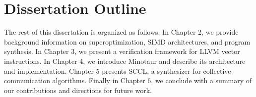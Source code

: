 \section{Dissertation Outline}

The rest of this dissertation is organized as follows. In Chapter 2, we
provide background information on superoptimization, SIMD architectures,
and program synthesis. In Chapter 3, we present a verification framework
for LLVM vector instructions. In Chapter 4, we introduce Minotaur and
describe its architecture and implementation. Chapter 5 presents SCCL,
a synthesizer for collective communication algorithms. Finally in Chapter
6, we conclude with a summary of our contributions and directions for
future work.